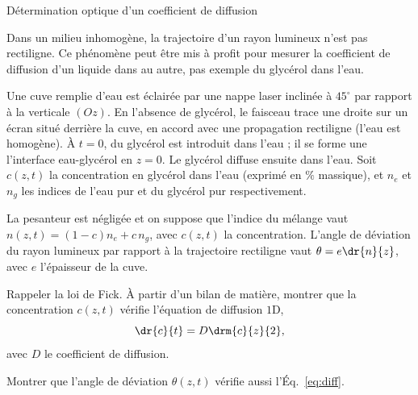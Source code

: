 \begin{exo}[PSI][1]{Détermination optique d'un coefficient de diffusion}

Dans un milieu inhomogène, la trajectoire d'un rayon lumineux n'est pas rectiligne. Ce phénomène peut être mis à profit pour mesurer la coefficient de diffusion d'un liquide dans au autre, pas exemple du glycérol dans l'eau.

Une cuve remplie d'eau est éclairée par une nappe laser inclinée à $45^\circ$ par rapport à la verticale $(Oz)$. En l'absence de glycérol, le faisceau trace une droite sur un écran situé derrière la cuve, en accord avec une propagation rectiligne (l'eau est homogène). À $t=0$, du glycérol est introduit dans l'eau ; il se forme une l'interface eau-glycérol en $z=0$. Le glycérol diffuse ensuite dans l'eau. Soit $c(z,t)$ la concentration en glycérol dans l'eau (exprimé en $\%$ massique), et $n_e$ et $n_g$ les indices de l'eau pur et du glycérol pur respectivement.


La pesanteur est négligée et on suppose que l'indice du mélange vaut $n(z,t)=(1-c)n_e + c\,n_g$, avec $c(z,t)$ la concentration. L'angle de déviation du rayon lumineux par rapport à la trajectoire rectiligne vaut $\theta = e \dr{n}{z}$, avec $e$ l'épaisseur de la cuve.
\begin{center}

\end{center}

\begin{quest}

\item Rappeler la loi de Fick. À partir d'un bilan de matière, montrer que la concentration $c(z,t)$ vérifie l'équation de diffusion $1$D,
\begin{equation}
\label{eq:diff}
\dr{c}{t} = D \drm{c}{z}{2},
\end{equation}
avec $D$ le coefficient de diffusion.
\item Montrer que l'angle de déviation $\theta(z,t)$ vérifie aussi l'Éq.~\eqref{eq:diff}.


\end{quest}
\end{exo}
